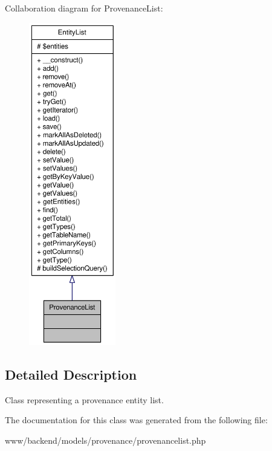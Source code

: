Collaboration diagram for ProvenanceList:\nopagebreak
\begin{figure}[H]
\begin{center}
\leavevmode
\includegraphics[height=400pt]{classProvenanceList__coll__graph}
\end{center}
\end{figure}


\subsection{Detailed Description}
Class representing a provenance entity list. 

The documentation for this class was generated from the following file:\begin{DoxyCompactItemize}
\item 
www/backend/models/provenance/provenancelist.php\end{DoxyCompactItemize}
